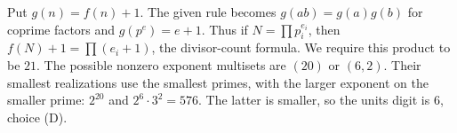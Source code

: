 Put $g(n)=f(n)+1$. The given rule becomes $g(ab)=g(a)g(b)$ for coprime factors and $g(p^e)=e+1$. Thus if $N=\prod p_i^{e_i}$, then $f(N)+1=\prod(e_i+1)$, the divisor-count formula. We require this product to be $21$. The possible nonzero exponent multisets are $(20)$ or $(6,2)$. Their smallest realizations use the smallest primes, with the larger exponent on the smaller prime: $2^{20}$ and $2^6\cdot3^2=576$. The latter is smaller, so the units digit is $\boxed{6}$, choice (D).
